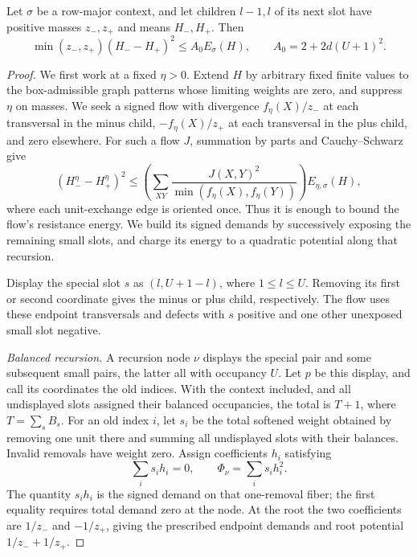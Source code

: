 \begin{lemma}\label{lem:transport}
Let $\sigma$ be a row-major context, and let children $l-1,l$ of its
next slot have positive masses $z_-,z_+$ and means $H_-,H_+$.  Then
\begin{equation}\label{eq:conditional-transport}
 \min(z_-,z_+)(H_--H_+)^2
 \le A_0 E_\sigma(H),\qquad A_0=2+2d(U+1)^2.
\end{equation}
\end{lemma}
\begin{proof}
We first work at a fixed $\eta>0$. Extend $H$ by arbitrary fixed finite
values to the box-admissible graph patterns whose limiting weights are
zero, and suppress $\eta$ on masses. We seek a signed flow with divergence
$f_\eta(X)/z_-$ at each transversal in the minus child,
$-f_\eta(X)/z_+$ at each transversal in the plus child, and zero elsewhere.
For such a flow $J$, summation by parts and Cauchy--Schwarz give
\[
 (H_-^\eta-H_+^\eta)^2
 \le \left(\sum_{XY}\frac{J(X,Y)^2}
                    {\min(f_\eta(X),f_\eta(Y))}\right)
                         E_{\eta,\sigma}(H),
\]
where each unit-exchange edge is oriented once. Thus it is enough to
bound the flow's resistance energy. We build its signed demands by
successively exposing the remaining small slots, and charge its energy
to a quadratic potential along that recursion.

Display the special slot $s$ as $(l,U+1-l)$, where $1\le l\le U$.
Removing its first or second coordinate gives the minus or plus child,
respectively. The flow uses these endpoint transversals and defects
with $s$ positive and one other unexposed small slot negative.

\emph{Balanced recursion.}
A recursion node $\nu$ displays the special pair and some subsequent
small pairs, the latter all with occupancy $U$. Let $p$ be this display,
and call its coordinates the old indices. With the context included,
and all undisplayed slots assigned their balanced occupancies, the total
is $T+1$, where $T=\sum_s B_s$. For an old index $i$, let $s_i$ be the
total softened weight obtained by removing one unit there and summing
all undisplayed slots with their balances. Invalid removals have weight
zero. Assign coefficients $h_i$ satisfying
\begin{equation}\label{eq:balanced-demands}
 \sum_i s_i h_i=0,\qquad \Phi_\nu=\sum_i s_i h_i^2.
\end{equation}
The quantity $s_i h_i$ is the signed demand on that one-removal fiber;
the first equality requires total demand zero at the node. At the root
the two coefficients are $1/z_-$ and $-1/z_+$, giving the prescribed
endpoint demands and root potential $1/z_-+1/z_+$.


\end{proof}

